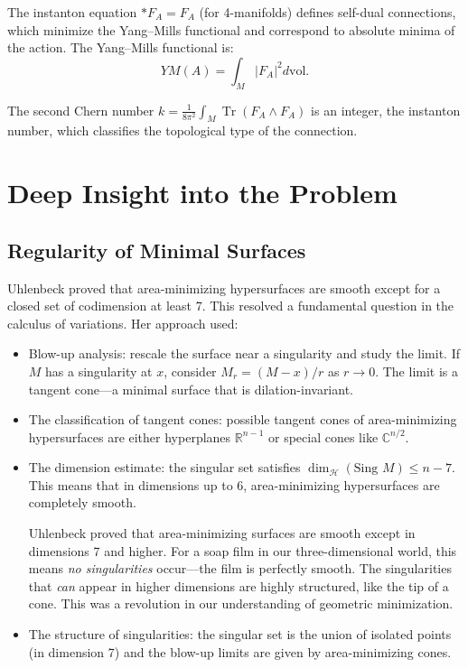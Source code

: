 The instanton equation $*F_A = F_A$ (for 4-manifolds) defines self-dual connections, which minimize the Yang--Mills functional and correspond to absolute minima of the action. The Yang--Mills functional is:
\[
YM(A) = \int_M |F_A|^2 d\text{vol}.
\]

The second Chern number $k = \frac{1}{8\pi^2} \int_M \operatorname{Tr}(F_A \wedge F_A)$ is an integer, the instanton number, which classifies the topological type of the connection.

\section{Deep Insight into the Problem}

\subsection{Regularity of Minimal Surfaces}

Uhlenbeck proved that area-minimizing hypersurfaces are smooth except for a closed set of codimension at least 7. This resolved a fundamental question in the calculus of variations. Her approach used:
\begin{itemize}
\item Blow-up analysis: rescale the surface near a singularity and study the limit. If $M$ has a singularity at $x$, consider $M_{r} = (M - x)/r$ as $r \to 0$. The limit is a tangent cone---a minimal surface that is dilation-invariant.
\item The classification of tangent cones: possible tangent cones of area-minimizing hypersurfaces are either hyperplanes $\mathbb{R}^{n-1}$ or special cones like $\mathbb{C}^{n/2}$.
\item The dimension estimate: the singular set satisfies $\dim_{\mathcal{H}}(\text{Sing } M) \leq n-7$. This means that in dimensions up to 6, area-minimizing hypersurfaces are completely smooth.

\begin{bigidea}
Uhlenbeck proved that area-minimizing surfaces are smooth except in
dimensions 7 and higher. For a soap film in our three-dimensional
world, this means \emph{no singularities} occur---the film is
perfectly smooth. The singularities that \emph{can} appear in higher
dimensions are highly structured, like the tip of a cone. This
was a revolution in our understanding of geometric minimization.
\end{bigidea}

\item The structure of singularities: the singular set is the union of isolated points (in dimension 7) and the blow-up limits are given by area-minimizing cones.
\end{itemize}

